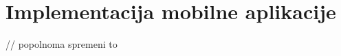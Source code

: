 \documentclass[a4paper, 12pt]{book}
\begin{document}
% 
% 
% 
% 
% 
% 




\section{Implementacija mobilne aplikacije}

// popolnoma spremeni to
\end{document}
